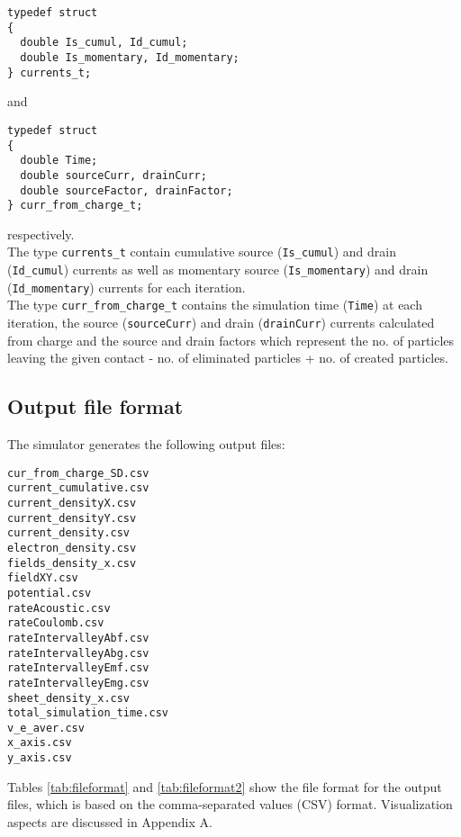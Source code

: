 \begin{verbatim}
typedef struct
{
  double Is_cumul, Id_cumul;
  double Is_momentary, Id_momentary;
} currents_t;
\end{verbatim}
and \clearpage
\begin{verbatim}
typedef struct
{
  double Time;
  double sourceCurr, drainCurr;
  double sourceFactor, drainFactor;
} curr_from_charge_t;
\end{verbatim}
respectively. \\
The type \texttt{currents\_t} contain cumulative source (\texttt{Is\_cumul}) and drain (\texttt{Id\_cumul}) currents as well as momentary source (\texttt{Is\_momentary}) and drain (\texttt{Id\_momentary}) currents for each iteration. \\
The type \texttt{curr\_from\_charge\_t} contains the simulation time (\texttt{Time}) at each iteration, the source (\texttt{sourceCurr}) and drain (\texttt{drainCurr}) currents calculated from charge and the source and drain factors which represent the no. of particles leaving the given contact - no. of eliminated particles + no. of created particles.

\subsection{Output file format}

The simulator generates the following output files: \\

\begin{lstlisting}
cur_from_charge_SD.csv
current_cumulative.csv
current_densityX.csv
current_densityY.csv
current_density.csv
electron_density.csv
fields_density_x.csv
fieldXY.csv
potential.csv
rateAcoustic.csv
rateCoulomb.csv
rateIntervalleyAbf.csv
rateIntervalleyAbg.csv
rateIntervalleyEmf.csv
rateIntervalleyEmg.csv
sheet_density_x.csv
total_simulation_time.csv
v_e_aver.csv
x_axis.csv
y_axis.csv
\end{lstlisting}

Tables \ref{tab:fileformat} and \ref{tab:fileformat2} show the file format for the output files, which is based on the
comma-separated values (CSV) format. Visualization aspects are discussed in Appendix A.

